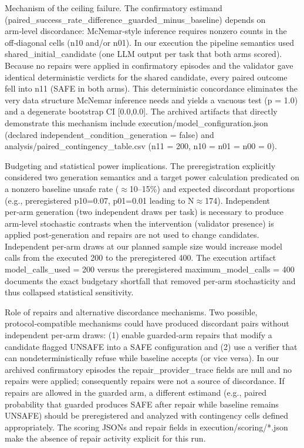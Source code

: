 \documentclass[conference]{IEEEtran}
\begin{document}
Mechanism of the ceiling failure. The confirmatory estimand (paired\_success\_rate\_difference\_guarded\_minus\_baseline) depends on arm‑level discordance: McNemar‑style inference requires nonzero counts in the off‑diagonal cells (n10 and/or n01). In our execution the pipeline semantics used shared\_initial\_candidate (one LLM output per task that both arms scored). Because no repairs were applied in confirmatory episodes and the validator gave identical deterministic verdicts for the shared candidate, every paired outcome fell into n11 (SAFE in both arms). This deterministic concordance eliminates the very data structure McNemar inference needs and yields a vacuous test (p = 1.0) and a degenerate bootstrap CI [0.0,0.0]. The archived artifacts that directly demonstrate this mechanism include execution/model\_configuration.json (declared independent\_condition\_generation = false) and analysis/paired\_contingency\_table.csv (n11 = 200, n10 = n01 = n00 = 0).

Budgeting and statistical power implications. The preregistration explicitly considered two generation semantics and a target power calculation predicated on a nonzero baseline unsafe rate (\ensuremath{\approx}10--15\%) and expected discordant proportions (e.g., preregistered p10=0.07, p01=0.01 leading to N\ensuremath{\approx}174). Independent per‑arm generation (two independent draws per task) is necessary to produce arm‑level stochastic contrasts when the intervention (validator presence) is applied post‑generation and repairs are not used to change candidates. Independent per‑arm draws at our planned sample size would increase model calls from the executed 200 to the preregistered 400. The execution artifact model\_calls\_used = 200 versus the preregistered maximum\_model\_calls = 400 documents the exact budgetary shortfall that removed per‑arm stochasticity and thus collapsed statistical sensitivity.

Role of repairs and alternative discordance mechanisms. Two possible, protocol‑compatible mechanisms could have produced discordant pairs without independent per‑arm draws: (1) enable guarded‑arm repairs that modify a candidate flagged UNSAFE into a SAFE configuration and (2) use a verifier that can nondeterministically refuse while baseline accepts (or vice versa). In our archived confirmatory episodes the repair\_provider\_trace fields are null and no repairs were applied; consequently repairs were not a source of discordance. If repairs are allowed in the guarded arm, a different estimand (e.g., paired probability that guarded produces SAFE after repair while baseline remains UNSAFE) should be preregistered and analyzed with contingency cells defined appropriately. The scoring JSONs and repair fields in execution/scoring/*.json make the absence of repair activity explicit for this run.
\end{document}
